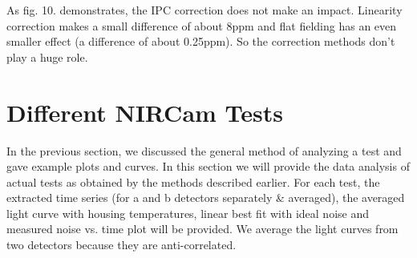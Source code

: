 \documentclass[conference]{IEEEtran}
\begin{document}
As fig. 10. demonstrates, the IPC correction does not make an impact. Linearity correction makes a small difference of about 8ppm and flat fielding has an even smaller effect (a difference of about 0.25ppm). So the correction methods don't play a huge role.  


\section{Different NIRCam Tests}
In the previous section, we discussed the general method of analyzing a test and gave example plots and curves. In this section we will provide the data analysis of actual tests as obtained by the methods described earlier. For each test, the extracted time series (for a and b detectors separately \& averaged), the averaged light curve with housing temperatures, linear best fit with ideal noise and measured noise vs. time plot will be provided. We average the light curves from two detectors because they are anti-correlated. 
\end{document}

